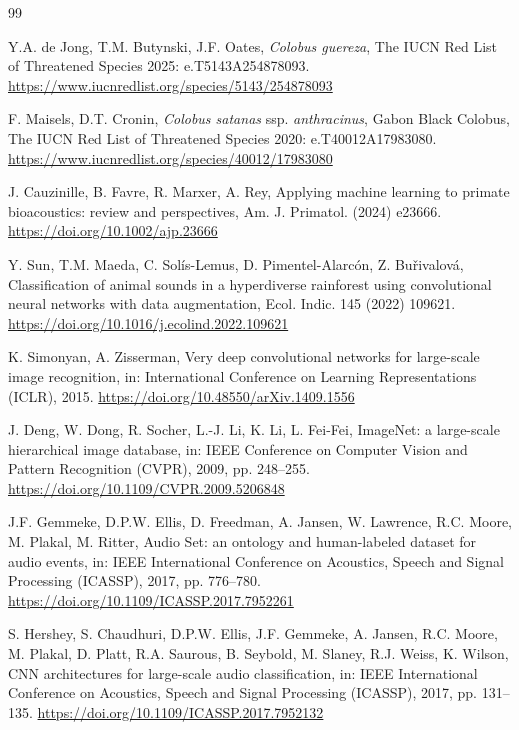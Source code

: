 \documentclass[review,3p,times]{elsarticle}
\begin{document}
\begin{thebibliography}{99}

Y.A. de Jong, T.M. Butynski, J.F. Oates, \textit{Colobus guereza}, The IUCN Red
List of Threatened Species 2025: e.T5143A254878093.
\url{https://www.iucnredlist.org/species/5143/254878093}

F. Maisels, D.T. Cronin, \textit{Colobus satanas} ssp. \textit{anthracinus},
Gabon Black Colobus, The IUCN Red List of Threatened Species 2020:
e.T40012A17983080.
\url{https://www.iucnredlist.org/species/40012/17983080}

J. Cauzinille, B. Favre, R. Marxer, A. Rey, Applying machine learning to
primate bioacoustics: review and perspectives, Am. J. Primatol. (2024) e23666.
\url{https://doi.org/10.1002/ajp.23666}

Y. Sun, T.M. Maeda, C. Sol\'is-Lemus, D. Pimentel-Alarc\'on, Z. Bu\v{r}ivalov\'a,
Classification of animal sounds in a hyperdiverse rainforest using convolutional
neural networks with data augmentation, Ecol. Indic. 145 (2022) 109621.
\url{https://doi.org/10.1016/j.ecolind.2022.109621}

K. Simonyan, A. Zisserman, Very deep convolutional networks for large-scale
image recognition, in: International Conference on Learning Representations
(ICLR), 2015. \url{https://doi.org/10.48550/arXiv.1409.1556}

J. Deng, W. Dong, R. Socher, L.-J. Li, K. Li, L. Fei-Fei, ImageNet: a
large-scale hierarchical image database, in: IEEE Conference on Computer
Vision and Pattern Recognition (CVPR), 2009, pp. 248--255.
\url{https://doi.org/10.1109/CVPR.2009.5206848}

J.F. Gemmeke, D.P.W. Ellis, D. Freedman, A. Jansen, W. Lawrence, R.C. Moore,
M. Plakal, M. Ritter, Audio Set: an ontology and human-labeled dataset for
audio events, in: IEEE International Conference on Acoustics, Speech and Signal
Processing (ICASSP), 2017, pp. 776--780.
\url{https://doi.org/10.1109/ICASSP.2017.7952261}

S. Hershey, S. Chaudhuri, D.P.W. Ellis, J.F. Gemmeke, A. Jansen, R.C. Moore,
M. Plakal, D. Platt, R.A. Saurous, B. Seybold, M. Slaney, R.J. Weiss,
K. Wilson, CNN architectures for large-scale audio classification, in: IEEE
International Conference on Acoustics, Speech and Signal Processing (ICASSP),
2017, pp. 131--135. \url{https://doi.org/10.1109/ICASSP.2017.7952132}


\end{thebibliography}
\end{document}
